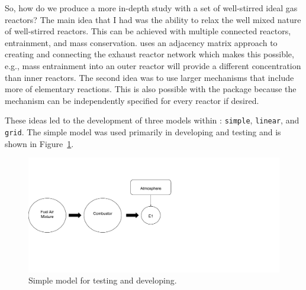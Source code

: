 \documentclass[smallextended,referee]{svjour3}
\begin{document}
So, how do we produce a more in-depth study with a set of well-stirred ideal gas reactors? The main idea that I had was the ability to relax the well mixed nature of well-stirred reactors. This can be achieved with multiple connected reactors, entrainment, and mass conservation. \pyplume{} uses an adjacency matrix approach to creating and connecting the exhaust reactor network which makes this possible, e.g., mass entrainment into an outer reactor will provide a different concentration than inner reactors. The second idea was to use larger mechanisms that include more of elementary reactions. This is also possible with the package because the mechanism can be independently specified for every reactor if desired. 

These ideas led to the development of three models within \pyplume: \texttt{simple}, \texttt{linear}, and \texttt{grid}. The simple model was used primarily in developing and testing and is shown in Figure~\ref{fig:simple}. 

\begin{figure}[htb!]
    \centering
    \includegraphics[scale=\SCALE,trim=1cm 5cm 1cm 4cm]{examples/report/figures/simple.pdf}

    \caption{Simple model for testing and developing.}
    \label{fig:simple}
\end{figure}
\end{document}
